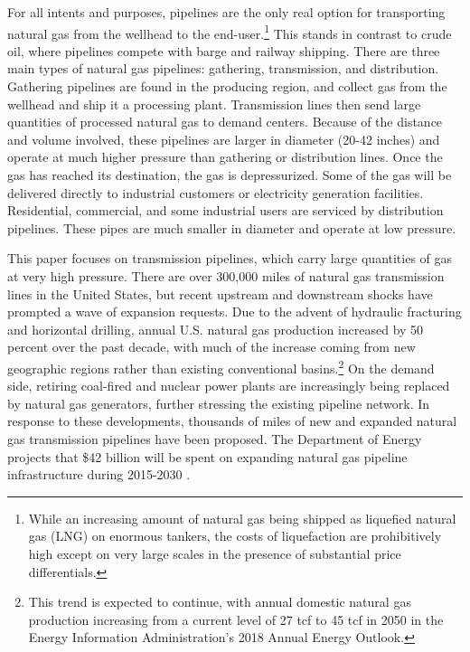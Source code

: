 \documentclass[12pt]{article}
\begin{document}
For all intents and purposes, pipelines are the only real option for
transporting natural gas from the wellhead to the end-user.\footnote{While an increasing amount of natural gas being shipped as liquefied
natural gas (LNG) on enormous tankers, the costs of liquefaction are
prohibitively high except on very large scales in the presence of
substantial price differentials. } This stands in contrast to crude oil, where pipelines compete with barge and railway shipping. There are three main types of natural gas pipelines: gathering, transmission, and distribution. Gathering
pipelines are found in the producing region, and collect gas from
the wellhead and ship it a processing plant. Transmission lines then
send large quantities of processed natural gas to demand centers.
Because of the distance and volume involved, these pipelines are larger
in diameter (20-42 inches) and operate at much higher pressure than
gathering or distribution lines. Once the gas has reached its destination,
the gas is depressurized. Some of the gas will be delivered directly
to industrial customers or electricity generation facilities. Residential,
commercial, and some industrial users are serviced by distribution
pipelines. These pipes are much smaller in diameter and operate at
low pressure.

This paper focuses on transmission pipelines, which carry large quantities
of gas at very high pressure. There are over 300,000 miles of natural
gas transmission lines in the United States, but recent upstream and
downstream shocks have prompted a wave of expansion requests. Due to
the advent of hydraulic fracturing and horizontal drilling, annual
U.S. natural gas production increased by 50 percent over the past
decade, with much of the increase coming from new geographic regions
rather than existing conventional basins.\footnote{This trend is expected to continue, with annual domestic natural gas
production increasing from a current level of 27 tcf to 45 tcf in
2050 in the Energy Information Administration's 2018 Annual Energy
Outlook. } On the demand side, retiring coal-fired and nuclear power plants
are increasingly being replaced by natural gas generators, further
stressing the existing pipeline network. In response to these developments, thousands
of miles of new and expanded natural gas transmission pipelines have
been proposed. The Department of Energy projects that \$42 billion
will be spent on expanding natural gas pipeline infrastructure during
2015-2030 \citep{united_states_department_of_energy_quadrennial_2015}. 
\end{document}
